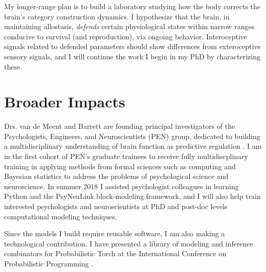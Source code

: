 \begin{singlespace}
My longer-range plan is to build a laboratory studying how the body corrects the brain's
category construction dynamics.  I hypothesize that the brain, in maintaining allostasis,
\emph{defends} certain physiological states within narrow ranges
conducive to survival (and reproduction), via ongoing behavior\cite{Sterling2012}.  Interoceptive
signals related to defended parameters should show differences from exteroceptive sensory signals, and I will continue the work I begin in my PhD by characterizing these.
\end{singlespace}

\section*{Broader Impacts}
\begin{singlespace}
Drs. van de Meent and Barrett are founding principal investigators of the Psychologists, Engineers,
and Neuroscientists (PEN) group, dedicated to building a multidisciplinary understanding of brain
function as predictive regulation \cite{Sterling2012,Kleckner2017}.  I am in the first cohort of
PEN's graduate trainees to receive fully multidiscplinary training in applying methods from 
formal sciences such as computing and Bayesian statistics to address the problems of
psychological science and neuroscience.  In summer 2018 I assisted psychologist
colleagues in learning Python and the PsyNeuLink block-modeling framework, and I will also help
train interested psychologists and neuroscientists at PhD and post-doc levels computational modeling
techniques.
\end{singlespace}

\begin{singlespace}
Since the models I build require reusable software, I am also making a technological
contribution.  I have presented a library of modeling and inference
combinators for Probabilistic Torch at the International Conference on Probabilistic Programming
\cite{Sennesh2018}.
\end{singlespace}
